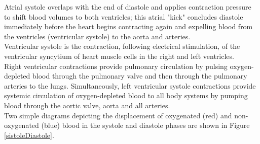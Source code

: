 \newpage

Atrial systole overlaps with the end of diastole and applies contraction pressure to shift blood volumes to both ventricles; this atrial "kick" concludes diastole immediately before the heart begins contracting again and expelling blood from the ventricles (ventricular systole) to the aorta and arteries.\\

Ventricular systole is the contraction, following electrical stimulation, of the ventricular syncytium of heart muscle cells in the right and left ventricles. \\
Right ventricular contractions provide pulmonary circulation by pulsing oxygen-depleted blood through the pulmonary valve and then through the pulmonary arteries to the lungs. Simultaneously, left ventricular systole contractions provide systemic circulation of oxygen-depleted blood to all body systems by pumping blood through the aortic valve, aorta and all arteries.\\
Two simple diagrams depicting the displacement of oxygenated (red) and non-oxygenated (blue) blood in the systole and diastole phases are shown in Figure \ref{sistoleDiastole}.

